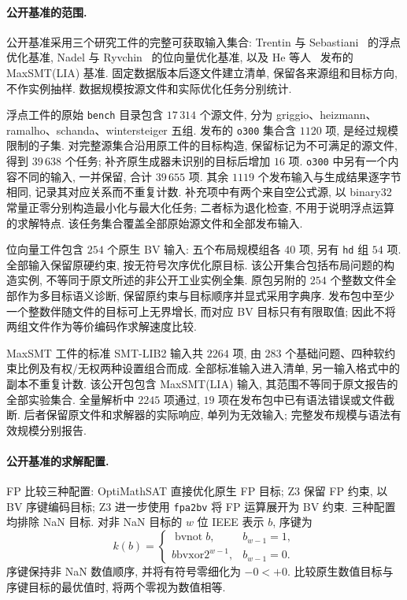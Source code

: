 
\paragraph{公开基准的范围.}
公开基准采用三个研究工件的完整可获取输入集合: Trentin 与 Sebastiani~\cite{DBLP:journals/jar/TrentinS21} 的浮点优化基准, Nadel 与 Ryvchin~\cite{DBLP:conf/tacas/NadelR16} 的位向量优化基准, 以及 He 等人~\cite{DBLP:conf/fm/HeLZC24} 发布的 MaxSMT(LIA) 基准. 固定数据版本后逐文件建立清单, 保留各来源组和目标方向, 不作实例抽样. 数据规模按源文件和实际优化任务分别统计.

浮点工件的原始 \texttt{bench} 目录包含 $17\,314$ 个源文件, 分为 griggio、heizmann、ramalho、schanda、wintersteiger 五组. 发布的 \texttt{o300} 集合含 $1120$ 项, 是经过规模限制的子集. 对完整源集合沿用原工件的目标构造, 保留标记为不可满足的源文件, 得到 $39\,638$ 个任务; 补齐原生成器未识别的目标后增加 $16$ 项. \texttt{o300} 中另有一个内容不同的输入, 一并保留, 合计 $39\,655$ 项. 其余 $1119$ 个发布输入与生成结果逐字节相同, 记录其对应关系而不重复计数. 补充项中有两个来自空公式源, 以 binary32 常量正零分别构造最小化与最大化任务; 二者标为退化检查, 不用于说明浮点运算的求解特点. 该任务集合覆盖全部原始源文件和全部发布输入.

位向量工件包含 $254$ 个原生 BV 输入: 五个布局规模组各 $40$ 项, 另有 \texttt{hd} 组 $54$ 项. 全部输入保留原硬约束, 按无符号次序优化原目标. 该公开集合包括布局问题的构造实例, 不等同于原文所述的非公开工业实例全集. 原包另附的 $254$ 个整数文件全部作为多目标语义诊断, 保留原约束与目标顺序并显式采用字典序. 发布包中至少一个整数伴随文件的目标可上无界增长, 而对应 BV 目标只有有限取值; 因此不将两组文件作为等价编码作求解速度比较.

MaxSMT 工件的标准 SMT-LIB2 输入共 $2264$ 项, 由 $283$ 个基础问题、四种软约束比例及有权/无权两种设置组合而成. 全部标准输入进入清单, 另一输入格式中的副本不重复计数. 该公开包包含 MaxSMT(LIA) 输入, 其范围不等同于原文报告的全部实验集合. 全量解析中 $2245$ 项通过, $19$ 项在发布包中已有语法错误或文件截断. 后者保留原文件和求解器的实际响应, 单列为无效输入; 完整发布规模与语法有效规模分别报告.

\paragraph{公开基准的求解配置.}
FP 比较三种配置: OptiMathSAT 直接优化原生 FP 目标; Z3 保留 FP 约束, 以 BV 序键编码目标; Z3 进一步使用 \texttt{fpa2bv} 将 FP 运算展开为 BV 约束. 三种配置均排除 NaN 目标. 对非 NaN 目标的 $w$ 位 IEEE 表示 $b$, 序键为
\[
k(b)=\begin{cases}
  \mathop{\mathrm{bvnot}}b,& b_{w-1}=1,\\
  b\mathbin{\mathrm{bvxor}}2^{w-1},& b_{w-1}=0.
\end{cases}
\]
序键保持非 NaN 数值顺序, 并将有符号零细化为 $-0<+0$. 比较原生数值目标与序键目标的最优值时, 将两个零视为数值相等.

